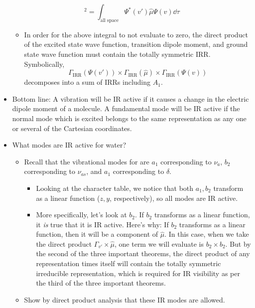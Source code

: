 \documentclass[../notes.tex]{subfiles}
\begin{document}
\begin{itemize}
    \begin{equation*}
        [M_{vv'}]^2 = \int_\text{all space}\Psi^*(v')\hat{\mu}\Psi(v)\dd\tau
    \end{equation*}
    \begin{itemize}
        \item In order for the above integral to not evaluate to zero, the direct product of the excited state wave function, transition dipole moment, and ground state wave function must contain the totally symmetric IRR. Symbolically,
        \begin{equation*}
            \Gamma_\text{IRR}(\Psi(v'))\times\Gamma_\text{IRR}(\hat{\mu})\times\Gamma_\text{IRR}(\Psi(v))
        \end{equation*}
        decomposes into a sum of IRRs including $A_1$.
    \end{itemize}
    \item Bottom line: A vibration will be IR active if it causes a change in the electric dipole moment of a molecule. A fundamental mode will be IR active if the normal mode which is excited belongs to the same representation as any one or several of the Cartesian coordinates.
    \item What modes are IR active for water?
    \begin{itemize}
        \item Recall that the vibrational modes for  are $a_1$ corresponding to $\nu_a$, $b_2$ corresponding to $\nu_{as}$, and $a_1$ corresponding to $\delta$.
        \begin{itemize}
            \item Looking at the character table, we notice that both $a_1,b_2$ transform as a linear function ($z,y$, respectively), so all modes are IR active.
            \item More specifically, let's look at $b_2$. If $b_2$ transforms as a linear function, it \emph{is} true that it is IR active. Here's why: If $b_2$ transforms as a linear function, then it will be a component of $\hat{\mu}$. In this case, when we take the direct product $\Gamma_{v'}\times\hat{\mu}$, one term we will evaluate is $b_2\times b_2$. But by the second of the three important theorems, the direct product of any representation times itself will contain the totally symmetric irreducible representation, which is required for IR visibility as per the third of the three important theorems.
        \end{itemize}
        \item Show by direct product analysis that these IR modes are allowed.

\end{itemize}
\end{itemize}
\end{document}
